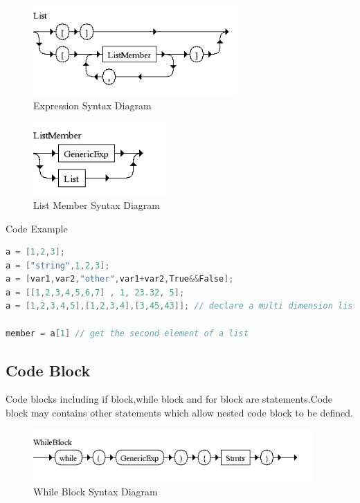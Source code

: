 \begin{figure}[h!]
  \centering
	\includegraphics[width=0.69\textwidth]{pic/c4/list.png}
	\caption{Expression Syntax Diagram}
\end{figure}


\begin{figure}[H]
  \centering
	\includegraphics[width=0.45\textwidth]{pic/c4/list_member.png}
	\caption{List Member Syntax Diagram}
\end{figure}

Code Example

\begin{lstlisting}[language=java]
a = [1,2,3];
a = ["string",1,2,3];
a = [var1,var2,"other",var1+var2,True&&False]; 
a = [[1,2,3,4,5,6,7] , 1, 23.32, 5];
a = [1,2,3,4,5],[1,2,3,4],[3,45,43]]; // declare a multi dimension list

member = a[1] // get the second element of a list
\end{lstlisting}


\subsection{Code Block}
Code blocks including if block,while block and for block are statements.Code block may contains other statements which allow nested code block to be defined.



\begin{figure}[H]
  \centering
	\includegraphics[width=0.95\textwidth]{pic/c4/while_block.png}
	\caption{While Block Syntax Diagram}
\end{figure}


